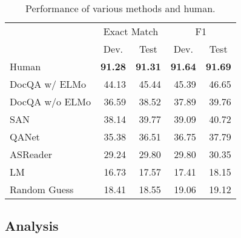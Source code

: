 \begin{table}[!t]
\centering
\small
\begin{tabular}{@{}lrr|rr@{}}
\toprule
\multirow{2}{*}{}                 & \multicolumn{2}{c}{Exact Match}                      & \multicolumn{2}{|c}{F1}                             \\ \cmidrule(l){2-5} 
                                  & \multicolumn{1}{c}{Dev.} & \multicolumn{1}{c|}{Test} & \multicolumn{1}{c}{Dev.} & \multicolumn{1}{c}{Test} \\ \midrule
\multicolumn{1}{l|}{Human}        & \textbf{91.28}           & \textbf{91.31}            & \textbf{91.64}           & \textbf{91.69}           \\ \midrule\midrule
\multicolumn{1}{l|}{DocQA w/ ELMo}        & 44.13                    & 45.44                     & 45.39                    & 46.65                    \\ 
\multicolumn{1}{l|}{DocQA w/o ELMo}  & 36.59                    & 38.52                     & 37.89                    & 39.76                    \\ \midrule
\multicolumn{1}{l|}{SAN}          & 38.14                    & 39.77                     & 39.09                    & 40.72                    \\ \midrule
\multicolumn{1}{l|}{QANet}        & 35.38                    & 36.51                     & 36.75                    & 37.79                    \\ \midrule\midrule
\multicolumn{1}{l|}{ASReader}     & 29.24                    & 29.80                     & 29.80                    & 30.35                    \\ \midrule
\multicolumn{1}{l|}{LM}           & 16.73                    & 17.57                     & 17.41                    & 18.15                    \\ \midrule
\midrule
\multicolumn{1}{l|}{Random Guess} & 18.41                    & 18.55                     & 19.06                    & 19.12                    \\ \bottomrule
\end{tabular}
\caption{Performance of various methods and human.}
\label{tab:performance}
\end{table}

\subsection{Analysis}
\label{sec:result-analysis}


